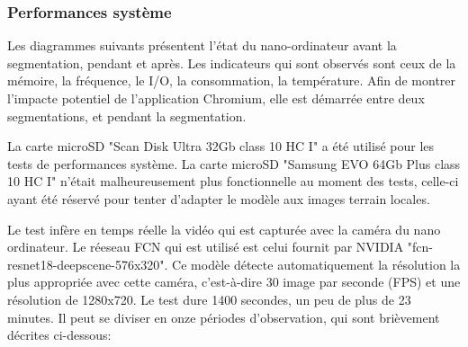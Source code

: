 \subsubsection{Performances système}
\par Les diagrammes suivants présentent l'état du nano-ordinateur avant la segmentation, pendant et après. Les indicateurs qui sont observés sont ceux de la mémoire, la fréquence, le I/O, la consommation, la température. Afin de montrer l'impacte potentiel de l'application Chromium, elle est démarrée entre deux segmentations, et pendant la segmentation. 
\par La carte microSD "Scan Disk Ultra 32Gb class 10 HC I" a été utilisé pour les tests de performances système. La carte microSD "Samsung EVO 64Gb Plus class 10 HC I" n'était malheureusement plus fonctionnelle au moment des tests, celle-ci ayant été réservé pour tenter d'adapter le modèle aux images terrain locales. 
\par Le test infère en temps réelle la vidéo qui est capturée avec la caméra du nano ordinateur. Le réeseau FCN qui est utilisé est celui fournit par NVIDIA "fcn-resnet18-deepscene-576x320". Ce modèle détecte automatiquement la résolution la plus appropriée avec cette caméra, c'est-à-dire 30 image par seconde (FPS) et une résolution de 1280x720. Le test dure 1400 secondes, un peu de plus de 23 minutes. Il peut se diviser en onze périodes d'observation, qui sont brièvement décrites ci-dessous: 
